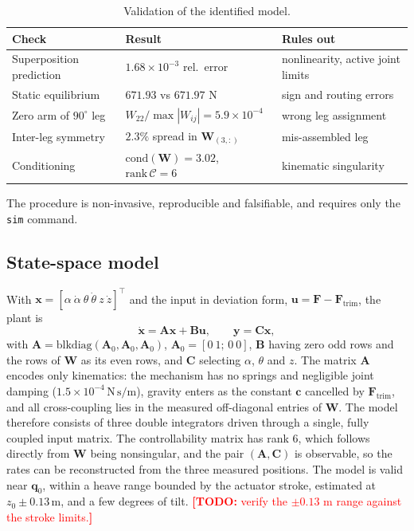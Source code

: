 \documentclass[]{IAC_style}
\newcommand{\todo}[1]{\textcolor{red}{\textbf{[TODO:} #1\textbf{]}}}
\newcommand{\W}{\bm{W}}
\newcommand{\Amat}{\bm{A}}
\newcommand{\Bmat}{\bm{B}}
\newcommand{\Cmat}{\bm{C}}
\newcommand{\qv}{\bm{q}}
\newcommand{\xv}{\bm{x}}
\newcommand{\uv}{\bm{u}}
\newcommand{\Fv}{\bm{F}}
\newcommand{\cv}{\bm{c}}
\newcommand{\un}[1]{\,\mathrm{#1}}
\begin{document}
\begin{table}[H]
\centering
\caption{Validation of the identified model.}
\label{tab:valid}
\footnotesize
\begin{tabularx}{\columnwidth}{@{}>{\raggedright\arraybackslash}p{2.2cm}LL@{}}
\toprule
Check & Result & Rules out\\
\midrule
Superposition prediction & $1.68\times10^{-3}$ rel.\ error & nonlinearity, active joint limits\\
Static equilibrium & $671.93$ vs $671.97$ N & sign and routing errors\\
Zero arm of $90^\circ$ leg & $W_{22}/\max|W_{ij}|=5.9\times10^{-4}$ & wrong leg assignment\\
Inter-leg symmetry & $2.3\%$ spread in $\W_{(3,:)}$ & mis-assembled leg\\
Conditioning & $\mathrm{cond}(\W)=3.02$, $\mathrm{rank}\,\mathcal{C}=6$ & kinematic singularity\\
\bottomrule
\end{tabularx}
\end{table}

The procedure is non-invasive, reproducible and falsifiable, and requires only the \texttt{sim} command.

\subsection{State-space model}
With $\xv=[\alpha\ \dot\alpha\ \theta\ \dot\theta\ z\ \dot z]^\top$ and the input in deviation form, $\uv=\Fv-\Fv_\mathrm{trim}$, the plant is
\begin{equation}
\dot{\xv}=\Amat\xv+\Bmat\uv,\qquad \bm{y}=\Cmat\xv,
\label{eq:ss}
\end{equation}
with $\Amat=\mathrm{blkdiag}(\bm{A}_0,\bm{A}_0,\bm{A}_0)$, $\bm{A}_0=[0\ 1;\,0\ 0]$, $\Bmat$ having zero odd rows and the rows of $\W$ as its even rows, and $\Cmat$ selecting $\alpha$, $\theta$ and $z$. The matrix $\Amat$ encodes only kinematics: the mechanism has no springs and negligible joint damping ($1.5\times10^{-4}\un{N\,s/m}$), gravity enters as the constant $\cv$ cancelled by $\Fv_\mathrm{trim}$, and all cross-coupling lies in the measured off-diagonal entries of $\W$. The model therefore consists of three double integrators driven through a single, fully coupled input matrix. The controllability matrix has rank 6, which follows directly from $\W$ being nonsingular, and the pair $(\Amat,\Cmat)$ is observable, so the rates can be reconstructed from the three measured positions. The model is valid near $\qv_0$, within a heave range bounded by the actuator stroke, estimated at $z_0\pm0.13\un{m}$, and a few degrees of tilt. \todo{verify the $\pm0.13$ m range against the stroke limits.}
\end{document}
